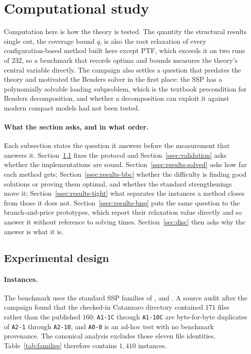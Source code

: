 \section{Computational study}\label{sec:comp}

Computation here is how the theory is tested. The quantity the
structural results single out, the coverage bound $q$, is also the root relaxation of
every configuration-based method built here except PTF, which exceeds it on two runs
of $232$, so a benchmark that records optima and bounds
measures the theory's central variable directly. The campaign also settles a question
that predates the theory and motivated the Benders solver in the first place: the SSP
has a polynomially solvable loading subproblem, which is the textbook precondition for
Benders decomposition, and whether a decomposition can exploit it against modern
compact models had not been tested.

\paragraph{What the section asks, and in what order.}
Each subsection states the question it answers before the measurement that answers it.
Section~\ref{ssec:bench} fixes the protocol and Section~\ref{ssec:validation} asks
whether the implementations are sound. Section~\ref{ssec:results-solved} asks how far
each method gets; Section~\ref{ssec:results-bbc} whether the difficulty is finding good
solutions or proving them optimal, and whether the standard strengthenings move it;
Section~\ref{ssec:results-tight} what separates the instances a method closes from
those it does not. Section~\ref{ssec:results-bnp} puts the same question to the
branch-and-price prototypes, which report their relaxation value directly and so answer
it without reference to solving times. Section~\ref{sec:disc} then asks why the answer
is what it is.

\subsection{Experimental design}\label{ssec:bench}

\paragraph{Instances.}
The benchmark uses the standard SSP families of \citet{daSilva2024},
\citet{Crama1994} and \citet{Laporte2004}. A source audit after the campaign found that
the checked-in Catanzaro directory contained $171$ files rather than the published
$160$: \texttt{A1-1C} through \texttt{A1-10C} are byte-for-byte duplicates of
\texttt{A2-1} through \texttt{A2-10}, and \texttt{A0-0} is an ad-hoc test with no
benchmark provenance. The canonical analysis excludes those eleven file identities.
Table~\ref{tab:families} therefore contains $1{,}410$ instances.

